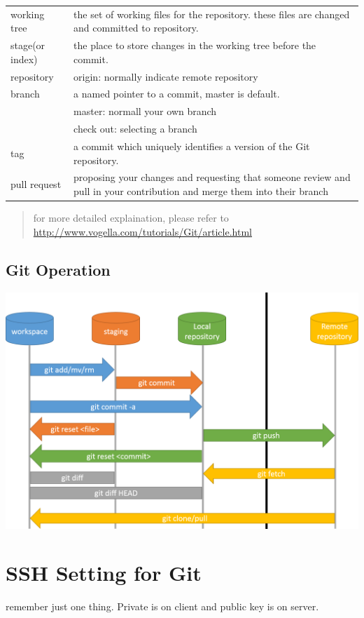 \documentclass[bigger]{beamer}
\begin{document}
\begin{center}
\begin{tabular}{ll}
working tree & the set of working files for the repository. these files are changed and committed to repository.\\
stage(or index) & the place to store changes in the working tree before the commit.\\
repository & origin: normally indicate remote repository\\
branch & a named pointer to a commit, \alert{master} is default.\\
 & master: normall your own branch\\
 & check out: selecting a branch\\
tag & a commit which uniquely identifies a version of the Git repository.\\
pull request & proposing your changes and requesting that someone review and pull in your contribution and merge them into their branch\\
\end{tabular}
\end{center}


\begin{quote}
for more detailed explaination, please refer to \url{http://www.vogella.com/tutorials/Git/article.html}
\end{quote}


\subsection{Git Operation}
\label{sec:orgheadline1}
\includegraphics[width=.9\linewidth]{./git-operations.png}

\section{SSH Setting for Git}
\label{sec:orgheadline1}
remember just one thing. 
Private is on client and public key is on server.
\end{document}
